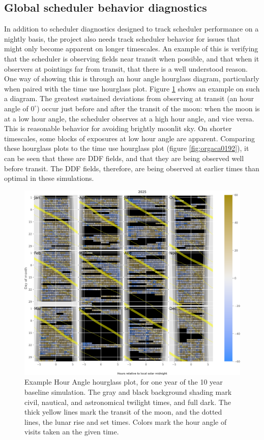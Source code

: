 \subsection{Global scheduler behavior diagnostics}
\label{sec:org99a14d8}
In addition to scheduler diagnostics designed to track scheduler performance on a nightly basis, the project also needs track scheduler behavior for issues that might only become apparent on longer timescales.
An example of this is verifying that the scheduler is observing fields near transit when possible, and that when it observers at pointings far from transit, that there is a well understood reason.
One way of showing this is through an hour angle hourglass diagram, particularly when paired with the time use hourglass plot.
Figure \ref{fig:orge7c73d8} shows an example on such a diagram.
The greatest sustained deviations from observing at transit (an hour angle of \(0^{\circ}\)) occur just before and after the transit of the moon: when the moon is at a low hour angle, the scheduler observes at a high hour angle, and vice versa.
This is reasonable behavior for avoiding brightly moonlit sky.
On shorter timescales, some blocks of exposures at low hour angle are apparent.
Comparing these hourglass plots to the time use hourglass plot (figure \ref{fig:orgaca0192}), it can be seen that these are DDF fields, and that they are being observed well before transit.
The DDF fields, therefore, are being observed at earlier times than optimal in these simulations.

\begin{figure}[htbp]
\centering
\includegraphics[width=1.0\textwidth]{./figures/hour_angle_hourglass.png}
\caption{\label{fig:orge7c73d8}Example Hour Angle hourglass plot, for one year of the 10 year baseline simulation. The gray and black background shading mark civil, nautical, and astronomical twilight times, and full dark. The thick yellow lines mark the transit of the moon, and the dotted lines, the lunar rise and set times. Colors mark the hour angle of visits taken an the given time.}
\end{figure}

